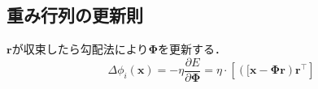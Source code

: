 \subsection{重み行列の更新則}$\mathbf{r}$が収束したら勾配法により$\mathbf{\Phi}$を更新する．
$$
\Delta \phi_i(\boldsymbol{x}) = -\eta \frac{\partial E}{\partial \mathbf{\Phi}}=\eta\cdot\left[\left([\mathbf{x}-\mathbf{\Phi}\mathbf{r}\right)\mathbf{r}^\top\right]
$$